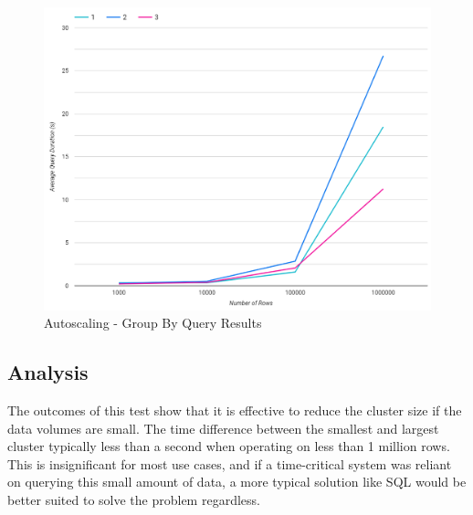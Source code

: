 \begin{figure}[h]
	\centering
	\includegraphics[width=0.8\linewidth]{chapters/diagrams/testing/group-by-simple-autoscale-test}
	\caption{Autoscaling - Group By Query Results}
	\label{fig:group-by-simple-autoscale-test}
\end{figure}

\subsection{Analysis}
The outcomes of this test show that it is effective to reduce the cluster size if the data volumes are small. The time difference between the smallest and largest cluster typically less than a second when operating on less than 1 million rows. This is insignificant for most use cases, and if a time-critical system was reliant on querying this small amount of data, a more typical solution like SQL would be better suited to solve the problem regardless.

